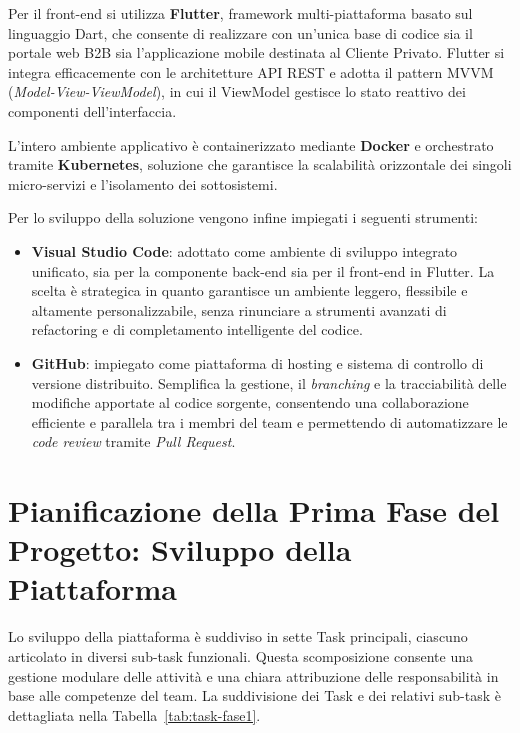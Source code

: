 Per il front-end si utilizza \textbf{Flutter}, framework multi-piattaforma basato sul linguaggio Dart, che consente di realizzare con un'unica base di codice sia il portale web B2B sia l'applicazione mobile destinata al Cliente Privato. Flutter si integra efficacemente con le architetture API REST e adotta il pattern MVVM (\textit{Model-View-ViewModel}), in cui il ViewModel gestisce lo stato reattivo dei componenti dell'interfaccia.

L'intero ambiente applicativo è containerizzato mediante \textbf{Docker} e orchestrato tramite \textbf{Kubernetes}, soluzione che garantisce la scalabilità orizzontale dei singoli micro-servizi e l'isolamento dei sottosistemi.

Per lo sviluppo della soluzione vengono infine impiegati i seguenti strumenti:

\begin{itemize}
    \item \textbf{Visual Studio Code}: adottato come ambiente di sviluppo integrato unificato, sia per la componente back-end sia per il front-end in Flutter. La scelta è strategica in quanto garantisce un ambiente leggero, flessibile e altamente personalizzabile, senza rinunciare a strumenti avanzati di refactoring e di completamento intelligente del codice.
    \item \textbf{GitHub}: impiegato come piattaforma di hosting e sistema di controllo di versione distribuito. Semplifica la gestione, il \textit{branching} e la tracciabilità delle modifiche apportate al codice sorgente, consentendo una collaborazione efficiente e parallela tra i membri del team e permettendo di automatizzare le \textit{code review} tramite \textit{Pull Request}.
\end{itemize}

\section{Pianificazione della Prima Fase del Progetto: Sviluppo della Piattaforma}

Lo sviluppo della piattaforma è suddiviso in sette Task principali, ciascuno articolato in diversi sub-task funzionali. Questa scomposizione consente una gestione modulare delle attività e una chiara attribuzione delle responsabilità in base alle competenze del team. La suddivisione dei Task e dei relativi sub-task è dettagliata nella Tabella~\ref{tab:task-fase1}.

